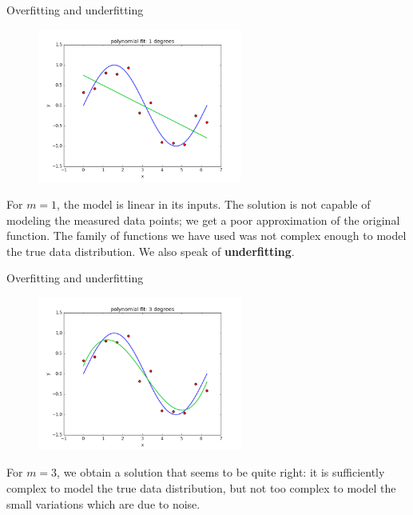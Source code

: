 \documentclass[xcolor=pdftex,dvipsnames,table]{beamer}
\begin{document}
\begin{frame}{Overfitting and underfitting}
\begin{figure}[htb]
\includegraphics[width=0.6\textwidth]{../graphics/polyfit_degree_1.png}
\end{figure}
For $m=1$, the model is linear in its inputs. The solution is not capable of modeling the measured data points; we get a poor approximation of the original function. The family of functions we have used was not complex enough to model the true data distribution. We also speak of \textbf{underfitting}.
\end{frame}

\begin{frame}{Overfitting and underfitting}
\begin{figure}[htb]
\includegraphics[width=0.6\textwidth]{../graphics/polyfit_degree_3.png}
\end{figure}
For $m=3$, we obtain a solution that seems to be quite right: it is sufficiently complex to model the true data distribution, but not too complex to model the small variations which are due to noise.
\end{frame}
\end{document}
